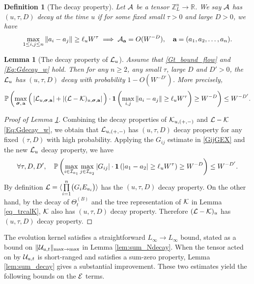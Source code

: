 \documentclass[10pt,reqno]{article}
\theoremstyle{plain} %
\newtheorem{lemma}[theorem]{Lemma}
\newtheorem{definition}[theorem]{Definition}
\theoremstyle{remark}
\numberwithin{equation}{section}
\begin{document}
\begin{definition}[The decay property]\label{Def_decay}
   Let  $\cal A$ be a tensor $\mathbb Z_L^n\to \mathbb R$. We say $\cal A$ has $(u, \tau, D)$ decay at the  time $u$ if  for some fixed small $\tau>0$ and large $D>0$, we have  
\begin{equation}\label{deccA}
    \max_{1\le i,j\le n}\|a_i-a_j\|\ge \ell_u W^{\tau} \implies  {\cal A}_{\textbf{a}}=O(W^{-D}),\quad \textbf{a}=(a_1,a_2,\ldots,a_n) .
\end{equation}
\end{definition}
\begin{lemma}[The decay property of ${\cal L}_u$]\label{lem_decayLoop}  
Assume that \eqref{Gt_bound_flow} and \eqref{Eq:Gdecay_w} hold. Then  for 
any $n\ge 2$, any small $\tau$, large $D$ and $D'>0$,  the  ${\cal L}_u$ has $(u, \tau, D)$ decay  with probability $1-O(W^{-D'})$. More precisely, 
\begin{align}\label{res_decayLK}
\mathbb P\left( \max_{\boldsymbol{\sigma},\,\textbf{a}}  \Big(\left|{\cal L}_{u,\boldsymbol{\sigma},\textbf{a}}\right|+\left|({\cal L}-{\cal K})_{u,\boldsymbol{\sigma},\textbf{a}}\right|\Big)\cdot{\bf 1}\left(\max_{  i, j } \|a_i-a_j\|\ge \ell_u W^{\tau}\right) \ge W^{-D}\right)\le W^{-D'} .
\end{align}
 \end{lemma}
 \begin{proof}[Proof of Lemma \ref{lem_decayLoop}] Combining  the decay properties  of ${\cal K}_{u,(+,-)}$ and $\cal L-\cal K$  \eqref{Eq:Gdecay_w}, we obtain that  
 ${\cal L}_{u,(+,-)}$ has $(u, \tau, D)$ decay property  for any fixed $(\tau, D)$  with high probability.
 Applying the $G_{ij}$ estimate in \eqref{GijGEX} and  the new ${\cal L}_u$ decay property, we have 
 $$
   \forall \tau, D, D', \quad \mathbb P\left( \max_{i\in {\cal I}_{a_1}}\max_{j\in {\cal I}_{a_2}}|G_{ij}|
 \cdot{\bf 1}\left( |a_1-a_2|\ge \ell_u W^{\tau}\right) \ge W^{-D}\right)\le W^{-D'} .
 $$
By definition  ${\cal L}=\langle \prod\limits_{i=1}^n \bigl(G_iE_{a_i}\bigr)\rangle $  has the $(u, \tau, D)$ decay property.  On the other hand, by the decay of $\Theta^{(B)}_t$ and  the tree representation of $\cal K$ in Lemma \ref{eq_trcalK},  $\cal K$ also   has $(u, \tau, D)$ decay property. Therefore $({\cal L-\cal K})_u$ has $(u, \tau, D)$ decay property. 
 
 \end{proof}


The evolution kernel satisfies a straightforward $L_\infty \to L_\infty$ bound, stated as a bound on $\|{\cal U}_{u,t}\|_{\max\to \max}$ in Lemma \ref{lem:sum_Ndecay}.
When the tensor acted on by ${\cal U}_{u,t}$ is short-ranged and satisfies a sum-zero property, Lemma \ref{lem:sum_decay} gives a substantial improvement.
These two estimates yield the following bounds on the $\cal E$ terms.
\end{document}
